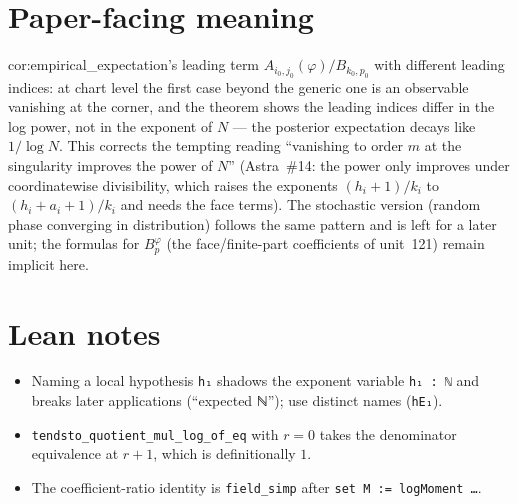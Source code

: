 \documentclass[11pt]{article}
\begin{document}
\section{Paper-facing meaning}
cor:empirical\_expectation's leading term $A_{i_0,j_0}(\varphi)/B_{k_0,p_0}$ with different leading
indices: at chart level the first case beyond the generic one is an observable vanishing at the
corner, and the theorem shows the leading indices differ in the log power, not in the exponent
of $N$ --- the posterior expectation decays like $1/\log N$. This corrects the tempting reading
``vanishing to order $m$ at the singularity improves the power of $N$'' (Astra~\#14: the power only
improves under coordinatewise divisibility, which raises the exponents $(h_i+1)/k_i$ to
$(h_i+a_i+1)/k_i$ and needs the face terms). The stochastic version (random phase converging in
distribution) follows the same pattern and is left for a later unit; the formulas for $B^\varphi_p$
(the face/finite-part coefficients of unit~121) remain implicit here.

\section{Lean notes}
\begin{itemize}
\item Naming a local hypothesis \texttt{h₁} shadows the exponent variable \texttt{h₁ : ℕ} and breaks
later applications (``expected ℕ''); use distinct names (\texttt{hE₁}).
\item \texttt{tendsto\_quotient\_mul\_log\_of\_eq} with $r=0$ takes the denominator equivalence at
$r+1$, which is definitionally $1$.
\item The coefficient-ratio identity is \texttt{field\_simp} after \texttt{set M := logMoment …}.
\end{itemize}
\end{document}
